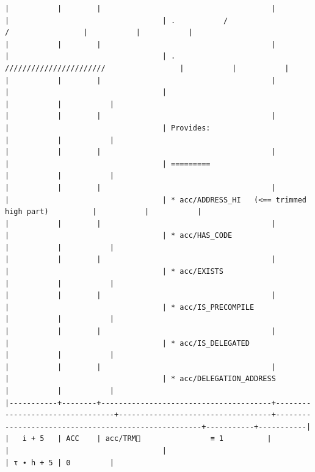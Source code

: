\documentclass[varwidth=\maxdimen,margin=0.5cm,multi={verbatim}]{standalone}
\begin{document}
\begin{verbatim}
|           |        |                                       |                                 |                                   | .           /                     /                 |           |           |
|           |        |                                       |                                 |                                   | .           ///////////////////////                 |           |           |
|           |        |                                       |                                 |                                   |                                                     |           |           |
|           |        |                                       |                                 |                                   | Provides:                                           |           |           |
|           |        |                                       |                                 |                                   | =========                                           |           |           |
|           |        |                                       |                                 |                                   | * acc/ADDRESS_HI   (<== trimmed high part)          |           |           |
|           |        |                                       |                                 |                                   | * acc/HAS_CODE                                      |           |           |
|           |        |                                       |                                 |                                   | * acc/EXISTS                                        |           |           |
|           |        |                                       |                                 |                                   | * acc/IS_PRECOMPILE                                 |           |           |
|           |        |                                       |                                 |                                   | * acc/IS_DELEGATED                                  |           |           |
|           |        |                                       |                                 |                                   | * acc/DELEGATION_ADDRESS                            |           |           |
|-----------+--------+---------------------------------------+---------------------------------+-----------------------------------+-----------------------------------------------------+-----------+-----------|
|   i + 5   | ACC    | acc/TRM🚩                ≡ 1          |                                 |                                   |                                                     | τ ∙ h + 5 | 0         |

\end{verbatim}
\end{document}
